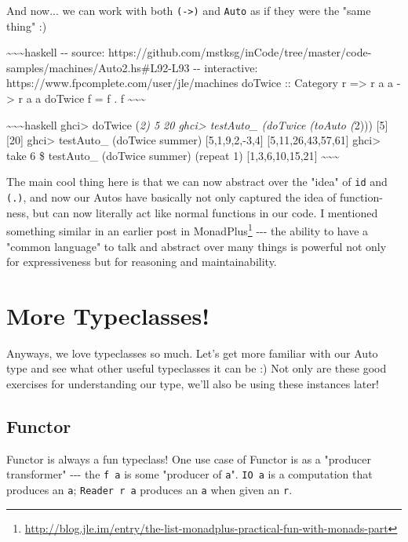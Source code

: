 \documentclass[]{article}
\renewcommand{\href}[2]{#2\footnote{\url{#1}}}
\begin{document}
And now... we can work with both \texttt{(-\textgreater{})} and \texttt{Auto} as
if they were the "same thing" :)

\textasciitilde{}\textasciitilde{}\textasciitilde{}haskell -\/- source:
https://github.com/mstksg/inCode/tree/master/code-samples/machines/Auto2.hs\#L92-L93
-\/- interactive: https://www.fpcomplete.com/user/jle/machines doTwice ::
Category r =\textgreater{} r a a -\textgreater{} r a a doTwice f = f . f
\textasciitilde{}\textasciitilde{}\textasciitilde{}

\textasciitilde{}\textasciitilde{}\textasciitilde{}haskell ghci\textgreater{}
doTwice (\emph{2) 5 20 ghci\textgreater{} testAuto\_ (doTwice (toAuto (}2)))
{[}5{]} {[}20{]} ghci\textgreater{} testAuto\_ (doTwice summer)
{[}5,1,9,2,-3,4{]} {[}5,11,26,43,57,61{]} ghci\textgreater{} take 6 \$
testAuto\_ (doTwice summer) (repeat 1) {[}1,3,6,10,15,21{]}
\textasciitilde{}\textasciitilde{}\textasciitilde{}

The main cool thing here is that we can now abstract over the "idea" of
\texttt{id} and \texttt{(.)}, and now our Autos have basically not only captured
the idea of function-ness, but can now literally act like normal functions in
our code. I mentioned something similar in an earlier post
\href{http://blog.jle.im/entry/the-list-monadplus-practical-fun-with-monads-part}{in
MonadPlus} -\/-\/- the ability to have a "common language" to talk and abstract
over many things is powerful not only for expressiveness but for reasoning and
maintainability.

\section{More Typeclasses!}

Anyways, we love typeclasses so much. Let's get more familiar with our Auto type
and see what other useful typeclasses it can be :) Not only are these good
exercises for understanding our type, we'll also be using these instances later!

\subsection{Functor}

Functor is always a fun typeclass! One use case of Functor is as a "producer
transformer" -\/-\/- the \texttt{f\ a} is some "producer of \texttt{a}".
\texttt{IO\ a} is a computation that produces an \texttt{a};
\texttt{Reader\ r\ a} produces an \texttt{a} when given an \texttt{r}.
\end{document}
